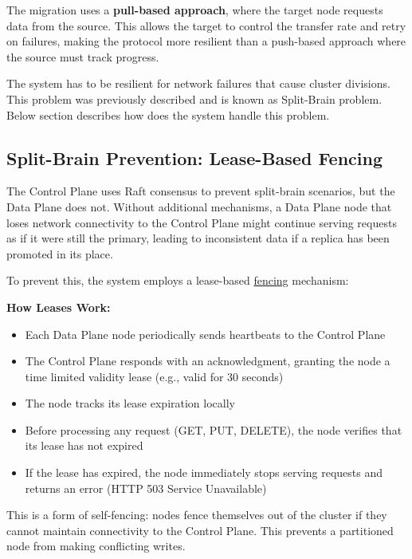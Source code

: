 \documentclass[shortabstract]{iithesis}
\begin{document}
The migration uses a \textbf{pull-based approach}, where the target node requests data from the source. This allows the target to control the transfer rate and retry on failures, making the protocol more resilient than a push-based approach where the source must track progress.

The system has to be resilient for network failures that cause cluster divisions. This problem was previously described and is known as Split-Brain problem. Below section describes how does the system handle this problem.

\subsection{Split-Brain Prevention: Lease-Based Fencing}

The Control Plane uses Raft consensus to prevent split-brain scenarios, but the Data Plane does not. Without additional mechanisms, a Data Plane node that loses network connectivity to the Control Plane might continue serving requests as if it were still the primary, leading to inconsistent data if a replica has been promoted in its place.

To prevent this, the system employs a lease-based \hyperref[def:fencing]{fencing} mechanism:

\textbf{How Leases Work:}
\begin{itemize}
    \item Each Data Plane node periodically sends heartbeats to the Control Plane
    \item The Control Plane responds with an acknowledgment, granting the node a time limited validity lease (e.g., valid for 30 seconds)
    \item The node tracks its lease expiration locally
    \item Before processing any request (GET, PUT, DELETE), the node verifies that its lease has not expired
    \item If the lease has expired, the node immediately stops serving requests and returns an error (HTTP 503 Service Unavailable)
\end{itemize}

This is a form of self-fencing: nodes fence themselves out of the cluster if they cannot maintain connectivity to the Control Plane. This prevents a partitioned node from making conflicting writes.
\end{document}
